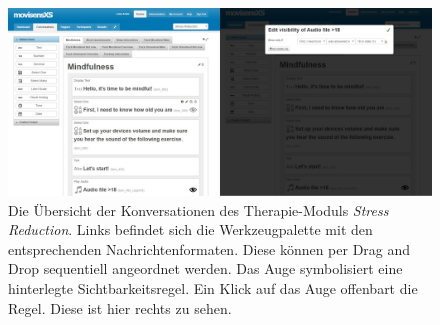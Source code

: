 \begin{figure}[h]
\centering
\includegraphics[width=1\textwidth]{pictures/movconv}
\caption{Die Übersicht der Konversationen des Therapie-Moduls \emph{Stress Reduction}. Links befindet sich die Werkzeugpalette mit den entsprechenden Nachrichtenformaten. Diese können per Drag and Drop sequentiell angeordnet werden. Das Auge symbolisiert eine hinterlegte Sichtbarkeitsregel. Ein Klick auf das Auge offenbart die Regel. Diese ist hier rechts zu sehen.}
\label{movconv}
\end{figure}
